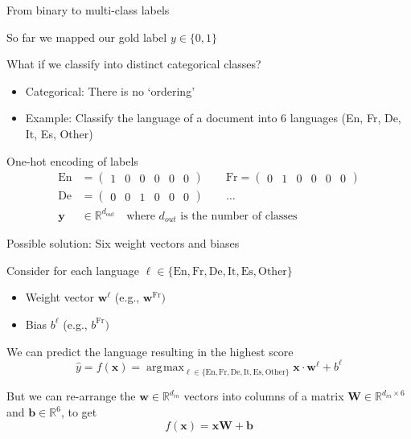\documentclass[12pt,aspectratio=169,handout]{beamer}
\DeclareMathOperator*{\argmax}{arg\!\max}
\begin{document}
\begin{frame}{From binary to multi-class labels}
	
So far we mapped our gold label $y \in \{0, 1\}$

What if we classify into distinct categorical classes?

\begin{itemize}
	\item Categorical: There is no `ordering'
	\item Example: Classify the language of a document into 6 languages (En, Fr, De, It, Es, Other)
\end{itemize}

\pause
\begin{block}{One-hot encoding of labels}
$$
\begin{aligned}
\text{En} &= \begin{pmatrix}1 & 0 & 0 & 0 & 0 & 0\end{pmatrix} \qquad
\text{Fr} = \begin{pmatrix}0 & 1 & 0 & 0 & 0 & 0\end{pmatrix} \\
\text{De} &= \begin{pmatrix}0 & 0 & 1 & 0 & 0 & 0\end{pmatrix} \qquad \ldots \\
\bm{y} &\in \mathbb{R}^{d_{out}} \quad \text{where } d_{out} \text{ is the number of classes}
\end{aligned}
$$
\end{block}
	
\end{frame}

\begin{frame}{Possible solution: Six weight vectors and biases}
	
Consider for each language $\ell \in \{\text{En}, \text{Fr}, \text{De}, \text{It}, \text{Es}, \text{Other}\}$
\begin{itemize}
	\item Weight vector $\bm{w}^{\ell}$ (e.g., $\bm{w}^{\text{Fr}})$
	\item Bias $b^{\ell}$ (e.g., $b^{\text{Fr}})$
\end{itemize}
\pause We can predict the language resulting in the highest score
$$
\hat{y} = f(\bm{x}) = \argmax_{
\ell \in \{\text{En}, \text{Fr}, \text{De}, \text{It}, \text{Es}, \text{Other}\}
}
\bm{x} \cdot \bm{w}^{\ell} + b^{\ell}
$$

\pause
But we can re-arrange the $\bm{w} \in \mathbb{R}^{d_{in}}$ vectors into columns of a matrix $\bm{W} \in \mathbb{R}^{d_{in} \times 6}$ and $\bm{b} \in \mathbb{R}^6$, to get
$$f(\bm{x}) = \bm{x} \bm{W} + \bm{b}$$
	
\end{frame}
\end{document}
